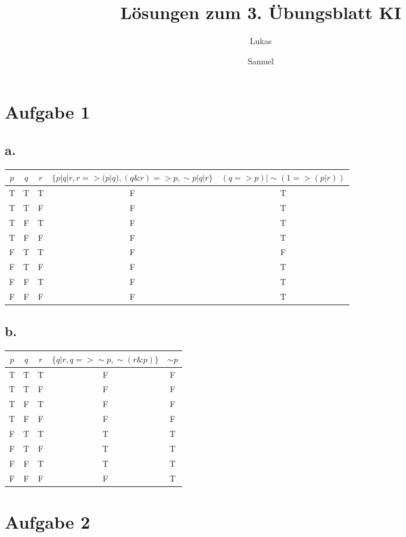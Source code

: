 \documentclass{article}
\begin{document}
\title{L\"osungen zum 3. \"Ubungsblatt KI}
\author{Lukas \and Samuel}

\maketitle

\section*{Aufgabe 1}
\subsection*{a.}
\begin{tabular}{*{3}{c}|*{2}{c}}$p$&$q$&$r$&$\{ p|q|r, r=> (p|q), (q \& r)=>p, \sim p | q | r \} $&$(q => p)| \sim(1 => (p | r))$\\
\hline
T&T&T&F&T\\
T&T&F&F&T\\
T&F&T&F&T\\
T&F&F&F&T\\
F&T&T&F&F\\
F&T&F&F&T\\
F&F&T&F&T\\
F&F&F&F&T\\
\end{tabular}


\subsection*{b.}
\begin{tabular}{*{3}{c}|*{2}{c}}$p$&$q$&$r$&$\{ q|r, q=> \sim p, \sim (r \& p)\}$&$\sim p$\\
\hline
T&T&T&F&F\\
T&T&F&F&F\\
T&F&T&F&F\\
T&F&F&F&F\\
F&T&T&T&T\\
F&T&F&T&T\\
F&F&T&T&T\\
F&F&F&F&T\\
\end{tabular}
\section*{Aufgabe 2}
\end{document}

